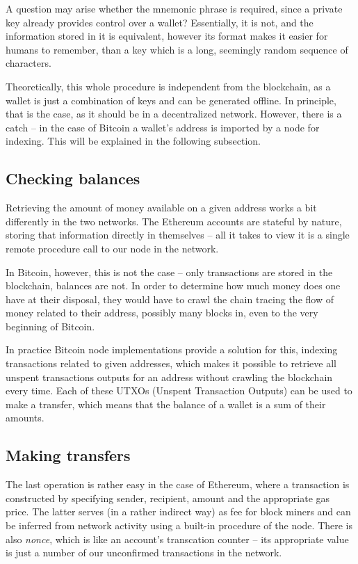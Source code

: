 A question may arise whether the mnemonic phrase is required, since a private key
already provides control over a wallet?
Essentially, it is not, and the information stored in it is equivalent,
however its format makes it easier for humans to remember,
than a key which is a long, seemingly random sequence of characters.

Theoretically, this whole procedure is independent from the blockchain,
as a wallet is just a combination of keys and can be generated offline.
In principle, that is the case, as it should be in a decentralized network.
However, there is a catch -- in the case of Bitcoin a wallet's address is imported by a node for indexing.
This will be explained in the following subsection.

\subsection{Checking balances}

Retrieving the amount of money available on a given address works a bit differently in the two networks.
The Ethereum accounts are stateful by nature, storing that information directly in themselves
-- all it takes to view it is a single remote procedure call to our node in the network.

In Bitcoin, however, this is not the case -- only transactions are stored in the blockchain,
balances are not. In order to determine how much money does one have at their disposal,
they would have to crawl the chain tracing the flow of money related to their address,
possibly many blocks in, even to the very beginning of Bitcoin.

In practice Bitcoin node implementations provide a solution for this,
indexing transactions related to given addresses,
which makes it possible to retrieve all unspent transactions outputs \cite{utxos} for an address
without crawling the blockchain every time.
Each of these UTXOs (Unspent Transaction Outputs) can be used to make a transfer,
which means that the balance of a wallet is a sum of their amounts.

\newpage

\subsection{Making transfers}

The last operation is rather easy in the case of Ethereum,
where a transaction is constructed by specifying sender, recipient, amount
and the appropriate gas price.
The latter serves (in a rather indirect way) as fee for block miners
and can be inferred from network activity using a built-in procedure of the node.
There is also \textit{nonce}, which is like an account's transcation counter
-- its appropriate value is just a number of our unconfirmed transactions in the network.

